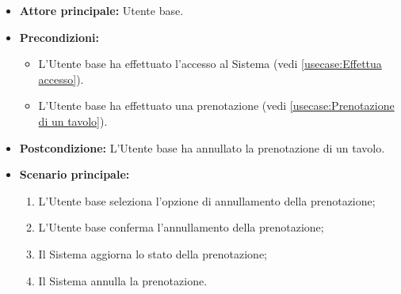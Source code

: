 \label{usecase:Annullamento della prenotazione}
\begin{itemize}
	\item \textbf{Attore principale:} Utente base.

	\item \textbf{Precondizioni:}
	\begin{itemize}
		\item L'Utente base ha effettuato l'accesso al Sistema (vedi \autoref{usecase:Effettua accesso}).
		\item L'Utente base ha effettuato una prenotazione (vedi \autoref{usecase:Prenotazione di un tavolo}).
	\end{itemize}  

	\item \textbf{Postcondizione:}
	      L'Utente base ha annullato la prenotazione di un tavolo.

	\item \textbf{Scenario principale:}
	      \begin{enumerate}
		      \item L'Utente base seleziona l'opzione di annullamento
		            della prenotazione;

		      \item L'Utente base conferma l'annullamento della prenotazione;
		      \item Il Sistema aggiorna lo stato della prenotazione;
		      
		      \item Il Sistema annulla la prenotazione.
	      \end{enumerate}
\end{itemize}

